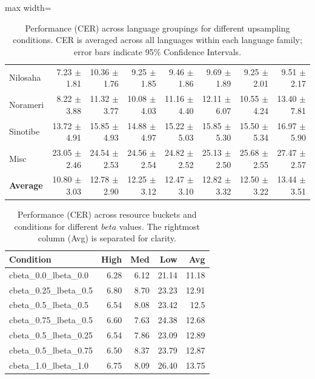 \begin{table}[htbp]
\begin{adjustbox}{max width=\textwidth}
\begin{tabular}{l r r r r r r r}
    Nilosaha   & 7.23 $\pm$ 1.81  & 10.36 $\pm$ 1.76 & 9.25 $\pm$ 1.85  & 9.46 $\pm$ 1.86  & 9.69 $\pm$ 1.89  & 9.25 $\pm$ 2.01  & 9.51 $\pm$ 2.17  \\
    Norameri   & 8.22 $\pm$ 3.88  & 11.32 $\pm$ 3.77 & 10.08 $\pm$ 4.03 & 11.16 $\pm$ 4.40 & 12.11 $\pm$ 6.07 & 10.55 $\pm$ 4.24 & 13.40 $\pm$ 7.81 \\
    Sinotibe   & 13.72 $\pm$ 4.91 & 15.85 $\pm$ 4.93 & 14.88 $\pm$ 4.97 & 15.22 $\pm$ 5.03 & 15.85 $\pm$ 5.30 & 15.50 $\pm$ 5.34 & 16.97 $\pm$ 5.90 \\
    Misc       & 23.05 $\pm$ 2.46 & 24.54 $\pm$ 2.53 & 24.56 $\pm$ 2.54 & 24.82 $\pm$ 2.52 & 25.13 $\pm$ 2.50 & 25.68 $\pm$ 2.55 & 27.47 $\pm$ 2.57 \\
    \midrule
    \textbf{Average} & 10.80 $\pm$ 3.03 & 12.78 $\pm$ 2.90 & 12.25 $\pm$ 3.12 & 12.47 $\pm$ 3.10 & 12.82 $\pm$ 3.32 & 12.50 $\pm$ 3.22 & 13.44 $\pm$ 3.51 \\
    \bottomrule
  \end{tabular}
  \end{adjustbox}
  \caption{Performance (CER) across language groupings for different upsampling conditions. CER is averaged across all languages within each language family; error bars indicate 95\% Confidence Intervals.}
  \label{tab:upsampling_cer_results_lang_family}
\end{table}

\begin{table}[htbp]
  \centering
  \begin{tabular}{l r r r | r}
    \toprule
    Condition & High & Med & Low & \textbf{Avg} \\
    \midrule
    cbeta\_0.0\_lbeta\_0.0   & 6.28 & 6.12 & 21.14 & 11.18 \\
    cbeta\_0.25\_lbeta\_0.5  & 6.80 & 8.70 & 23.23 & 12.91 \\
    cbeta\_0.5\_lbeta\_0.5   & 6.54 & 8.08 & 23.42 & 12.5 \\
    cbeta\_0.75\_lbeta\_0.5  & 6.60 & 7.63 & 24.38 & 12.68 \\
    cbeta\_0.5\_lbeta\_0.25  & 6.54 & 7.86 & 23.09 & 12.89 \\
    cbeta\_0.5\_lbeta\_0.75  & 6.50	& 8.37 & 23.79 & 12.87 \\
    cbeta\_1.0\_lbeta\_1.0   & 6.75 & 8.09 & 26.40 & 13.75 \\
    \bottomrule
  \end{tabular}
  \caption{Performance (CER) across resource buckets and conditions for different $beta$ values. The rightmost column (Avg) is separated for clarity.}
  \label{tab:upsampling_cer_results_resource_bucket}
\end{table} 

